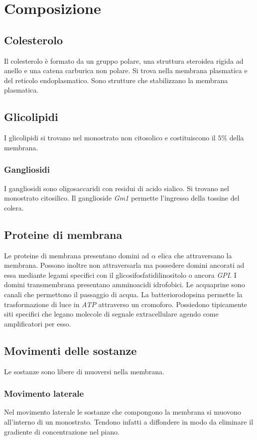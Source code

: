 \section{Composizione}
	
	\subsection{Colesterolo}
	Il colesterolo \`e formato da un gruppo polare, una struttura steroidea rigida ad anello e una catena carburica non polare.
	Si trova nella membrana plasmatica e del reticolo endoplasmatico.
	Sono strutture che stabilizzano la membrana plasmatica.

	\subsection{Glicolipidi}
	I glicolipidi si trovano nel monostrato non citosolico e costituiscono il $5\%$ della membrana.
		
		\subsubsection{Gangliosidi}
		I gangliosidi sono oligosaccaridi con residui di acido sialico.
		Si trovano nel monostrato citosilico.
		Il ganglioside \emph{Gm1} permette l'ingresso della tossine del colera.

	\subsection{Proteine di membrana}
	Le proteine di membrana presentano domini ad $\alpha$ elica che attraversano la membrana.
	Possono inoltre non attraversarla ma possedere domini ancorati ad essa mediante legami specifici con il glicosifosfatidilinositolo o ancora \emph{GPI}.
	I domini transmembrana presentano amminoacidi idrofobici.
	Le acquaprine sono canali che permettono il passaggio di acqua.
	La batteriorodopsina permette la trasformazione di luce in \emph{ATP} attraverso un cromoforo.
	Possiedono tipicamente siti specifici che legano molecole di segnale extracellulare agendo come amplificatori per esso.

	\subsection{Movimenti delle sostanze}
	Le sostanze sono libere di muoversi nella membrana.

		\subsubsection{Movimento laterale}
		Nel movimento laterale le sostanze che compongono la membrana si muovono all'interno di un monostrato.
		Tendono infatti a diffondere in modo da eliminare il gradiente di concentrazione nel piano.

